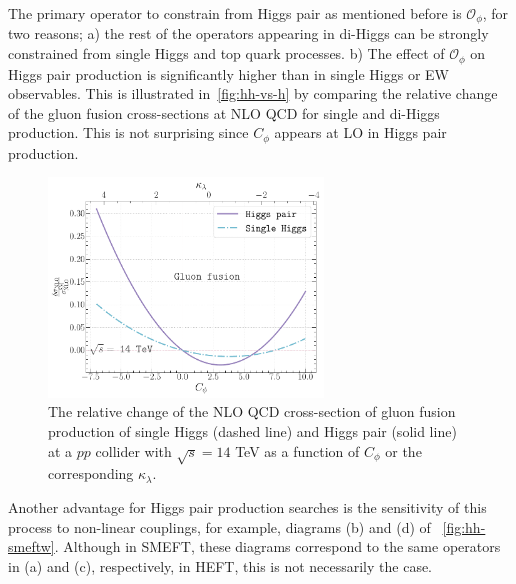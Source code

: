 \par The primary operator to constrain from Higgs pair as mentioned before is $\mathcal{O}_{\phi}$, for two reasons; a) the rest of the operators appearing in di-Higgs can be strongly constrained from single Higgs and top quark processes. b) The effect of $\mathcal{O}_{\phi}$ on Higgs pair production is significantly higher than in single Higgs or EW observables. This is illustrated in~\autoref{fig:hh-vs-h} by comparing the relative change of the gluon fusion cross-sections at NLO QCD for single and di-Higgs production. This is not surprising since $C_\phi$ appears at LO in Higgs pair production.
\begin{figure}[h!]
	\begin{center}
		\includegraphics[width=0.65\textwidth]{figures/trilinear_single_vs_double}
		\caption{ The relative change of the NLO QCD cross-section of gluon fusion production of single Higgs (dashed line) and Higgs pair (solid line) at a $pp$ collider with $\sqrt{s}=14$ TeV as a function of $C_\phi$ or the corresponding $\kappa_\lambda$. \label{fig:hh-vs-h} }
	\end{center}
\end{figure}
\par Another advantage for Higgs pair production searches is the sensitivity of this process to non-linear couplings, for example, diagrams (b) and (d) of ~\autoref{fig:hh-smeftw}. Although in SMEFT, these diagrams correspond to the same operators in (a) and (c), respectively, in HEFT, this is not necessarily the case.
